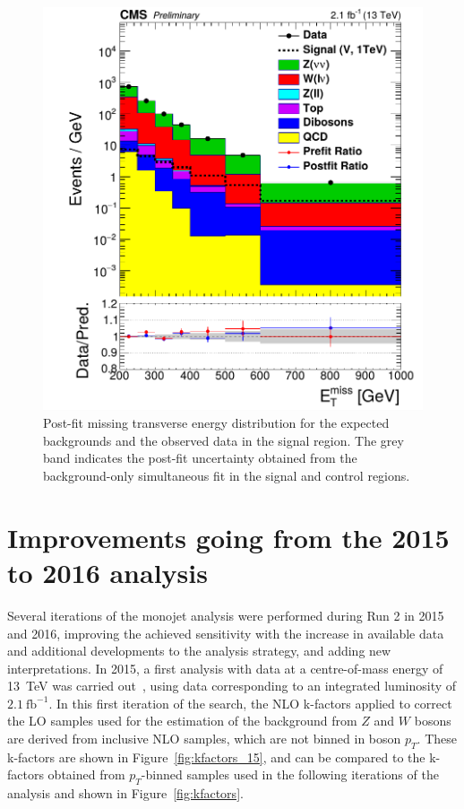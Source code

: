 \begin{figure}[p]
  \centering
 \includegraphics[width=.7\textwidth]{results.png} 
 \caption{Post-fit missing transverse energy distribution for the expected backgrounds and the observed data in the signal region. The grey band indicates the post-fit uncertainty obtained from the background-only simultaneous fit in the signal and control regions.}
 \label{fig:results}
\end{figure}

\section{Improvements going from the 2015 to 2016 analysis}
\label{sec:improvement}

Several iterations of the monojet analysis were performed during Run 2 in 2015 and 2016, improving the achieved sensitivity with the increase in available data and additional developments to the analysis strategy, and adding new interpretations. In 2015, a first analysis with data at a centre-of-mass energy of \SI{13}{TeV} was carried out~\cite{CMS:2015jdt}, using data corresponding to an integrated luminosity of $2.1\ \mathrm{fb}^{-1}$. In this first iteration of the search, the NLO k-factors applied to correct the \ac{LO} samples used for the estimation of the background from $Z$ and $W$ bosons are derived from inclusive \ac{NLO} samples, which are not binned in boson $p_T$. These k-factors are shown in Figure~\ref{fig:kfactors_15}, and can be compared to the k-factors obtained from $p_T$-binned samples used in the following iterations of the analysis and shown in Figure~\ref{fig:kfactors}.

